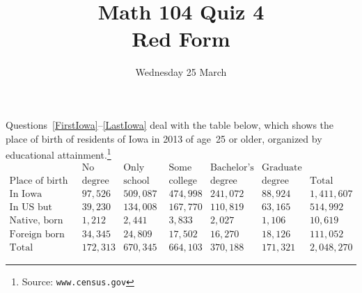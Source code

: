 \documentclass[answers,12pt]{exam}
\title{Math 104 Quiz 4\\Red Form}
\date{Wednesday 25 March}
\begin{document}
\maketitle
\thispagestyle{empty}
\begin{center}
\end{center}

Questions~\ref{FirstIowa}--\ref{LastIowa} deal with
the table below, which shows the place of birth of 
residents of Iowa 
in 2013 of age~25 or older,
organized by educational
attainment.\footnote{
Source: \tt www.census.gov}
\[\begin{array}{r|rrrrr|r}

&\text{No}&\text{Only high}&\text{Some}&\text{Bachelor's}&\text{Graduate}\\
\text{Place of birth}&\text{degree}
&\text{school}&\text{college}&\text{degree}&\text{degree}&\text{Total}
\\\hline
\text{In Iowa}
&97,526&509,087&474,998&241,072&88,924&1,411,607\\
\text{In US but outside Iowa}
&39,230&134,008&167,770&110,819&63,165&514,992\\
\text{Native, born outside US}
&1,212&2,441&3,833&2,027&1,106&10,619\\
\text{Foreign born}
&34,345&24,809&17,502&16,270&18,126&111,052\\\hline
\text{Total}
&172,313&670,345&664,103&370,188&171,321&2,048,270
\end{array}\]
\end{document}
